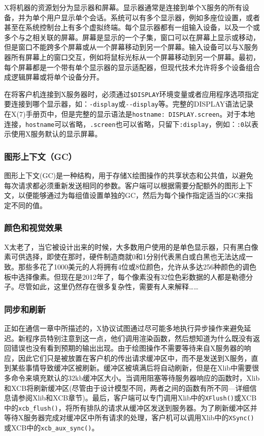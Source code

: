 X将机器的资源划分为显示器和屏幕。显示器通常是连接到单个X服务的所有设备，并为单个用户显示单个会话。系统可以有多个显示器，例如多座位设置，或者甚至在系统控制台上有多个虚拟终端。每个显示器都有一组输入设备，以及一个或多个与之相关联的屏幕。屏幕是显示的一个子集，窗口可以在屏幕上显示或移动，但是窗口不能跨多个屏幕或从一个屏幕移动到另一个屏幕。输入设备可以与X服务器所有屏幕上的窗口交互，例如将鼠标光标从一个屏幕移动到另一个屏幕。最初，每个屏幕都是一个带有单个显示器的显示适配器，但现代技术允许将多个设备组合成逻辑屏幕或将单个设备分开。

在将客户机连接到X服务器时，必须通过\lstinline|$DISPLAY|环境变量或者应用程序选项指定要连接到哪个显示器，如：\lstinline|-display|或\lstinline|--display|等。完整的DISPLAY语法记录在X(7)手册页中，但是完整的显示语法是\lstinline|hostname: DISPLAY.screen|。对于本地连接，\lstinline|hostname|可以省略，\lstinline|.screen|也可以省略，只留下\lstinline|:display|，例如：\lstinline|:0|以表示使用X服务默认的显示屏幕。

\subsubsection{图形上下文（GC）}

图形上下文(GC)是一种结构，用于存储X绘图操作的共享状态和公共值，以避免每次请求都必须重新发送相同的参数。客户端可以根据需要分配额外的图形上下文，以便能够通过为每组值设置单独的GC，然后为每个操作指定适当的GC来指定不同的值。


\subsubsection{颜色和视觉效果}

X太老了，当它被设计出来的时候，大多数用户使用的是单色显示器，只有黑白像素可供选择，即使在那时，硬件制造商就0和1分别代表黑白或白黑也无法达成一致。那些多花了1000美元的人将拥有4位或8位颜色，允许从多达256种颜色的调色板中选择像素。但现在是2012年了，每个像素没有32位色彩数据的人都是勒德分子。尽管如此，这里仍然存在很多复杂性，需要有人来解释……

\subsubsection{同步和刷新}

正如在通信一章中所描述的，X协议试图通过尽可能多地执行异步操作来避免延迟。新程序员特别注意到这一点，他们调用渲染函数，然后想知道为什么既没有返回错误也没有看到预期的输出出现。由于绘图操作不需要等待来自X服务器的响应，因此它们只是被放置在客户机的传出请求缓冲区中，而不是发送到X服务，直到某些事情导致缓冲区被刷新。缓冲区被填满后将自动刷新，但是在Xlib中需要很多命令来填充默认的32kb缓冲区大小。当调用阻塞等待服务器响应的函数时，Xlib和XCB将刷新缓冲区(尽管由于设计模型不同，两者之间的函数有所不同—详细信息请参阅Xlib和XCB章节)。最后，客户端可以专门调用Xlib中的\lstinline|XFlush()|或XCB中的\lstinline|xcb_flush()|，将所有排队的请求从缓冲区发送到服务器。为了刷新缓冲区并等待X服务器完成对缓冲区中所有请求的处理，客户机可以调用Xlib中的\lstinline|XSync()|或XCB中的\lstinline|xcb_aux_sync()|。

